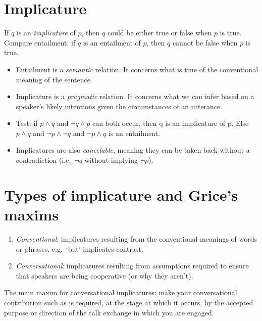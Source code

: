 \section{Implicature}

\begin{definition}[Implicature]
If $q$ is an \emph{implicature} of $p$, then $q$ could be either true or false when $p$ is true. Compare entailment: if $q$ is an entailment of $p$, then $q$ cannot be false when $p$ is true.
\end{definition}

\begin{itemize}
  \item Entailment is a \emph{semantic} relation. It concerns what is true of the conventional meaning of the sentence.
  \item Implicature is a \emph{pragmatic} relation. It concerns what we can infer based on a speaker's likely intentions given the circumstances of an utterance.
  \item Test: if $p \wedge q$ and $\neg q \wedge p$ can both occur, then q is an implicature of p. Else $p \wedge q$ and $\neg p \wedge \neg q$ and $\neg p \wedge q$ is an entailment.
  \item Implicatures are also \emph{cancelable}, meaning they can be taken back without a contradiction (i.e.\ $\neg q$ without implying $\neg p$).
\end{itemize}

\section{Types of implicature and Grice's maxims}

\begin{definition}\leavevmode
\begin{enumerate}[label=\roman*.]
  \item \emph{Conventional}: implicatures resulting from the conventional meanings of words or phrases, e.g.\ `but' implicates contrast.
  \item \emph{Conversational}: implicatures resulting from assumptions required to ensure that speakers are being cooperative (or why they aren't).
\end{enumerate}
\end{definition}

\begin{definition}
The main maxim for conversational implicatures: make your conversational contribution such as is required, at the stage at which it occurs, by the accepted purpose or direction of the talk exchange in which you are engaged.
\end{definition}

